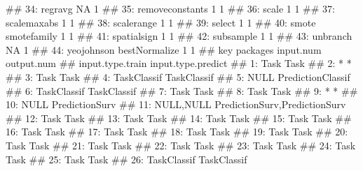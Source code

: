 \documentclass[12pt,]{scrbook}
\newenvironment{Shaded}{}{}
\newcommand{\NormalTok}[1]{#1}
\begin{document}
\begin{Shaded}
\begin{Highlighting}[]
\NormalTok{## 34:         regravg                      NA          1}
\NormalTok{## 35: removeconstants                       1          1}
\NormalTok{## 36:           scale                       1          1}
\NormalTok{## 37:     scalemaxabs                       1          1}
\NormalTok{## 38:      scalerange                       1          1}
\NormalTok{## 39:          select                       1          1}
\NormalTok{## 40:           smote   smotefamily         1          1}
\NormalTok{## 41:     spatialsign                       1          1}
\NormalTok{## 42:       subsample                       1          1}
\NormalTok{## 43:        unbranch                      NA          1}
\NormalTok{## 44:      yeojohnson bestNormalize         1          1}
\NormalTok{##                 key      packages input.num output.num}
\NormalTok{##     input.type.train            input.type.predict}
\NormalTok{##  1:             Task                          Task}
\NormalTok{##  2:                *                             *}
\NormalTok{##  3:             Task                          Task}
\NormalTok{##  4:      TaskClassif                   TaskClassif}
\NormalTok{##  5:             NULL             PredictionClassif}
\NormalTok{##  6:      TaskClassif                   TaskClassif}
\NormalTok{##  7:             Task                          Task}
\NormalTok{##  8:             Task                          Task}
\NormalTok{##  9:                *                             *}
\NormalTok{## 10:             NULL                PredictionSurv}
\NormalTok{## 11:        NULL,NULL PredictionSurv,PredictionSurv}
\NormalTok{## 12:             Task                          Task}
\NormalTok{## 13:             Task                          Task}
\NormalTok{## 14:             Task                          Task}
\NormalTok{## 15:             Task                          Task}
\NormalTok{## 16:             Task                          Task}
\NormalTok{## 17:             Task                          Task}
\NormalTok{## 18:             Task                          Task}
\NormalTok{## 19:             Task                          Task}
\NormalTok{## 20:             Task                          Task}
\NormalTok{## 21:             Task                          Task}
\NormalTok{## 22:             Task                          Task}
\NormalTok{## 23:             Task                          Task}
\NormalTok{## 24:             Task                          Task}
\NormalTok{## 25:             Task                          Task}
\NormalTok{## 26:      TaskClassif                   TaskClassif}

\end{Highlighting}
\end{Shaded}
\end{document}
